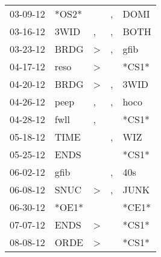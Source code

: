 \begin{supertabular}{p{0.07\textwidth}p{0.06\textwidth}p{0.02\textwidth}p{0.02\textwidth}p{0.06\textwidth}}
          03-09-12\textsuperscript{} &                            *OS2* &                  &                , &           DOMI\textsuperscript{} \\
          03-16-12\textsuperscript{} &           3WID\textsuperscript{} &                , &                , &           BOTH\textsuperscript{} \\
          03-23-12\textsuperscript{} &           BRDG\textsuperscript{} &     \textgreater &                , &           gfib\textsuperscript{} \\
          04-17-12\textsuperscript{} &           reso\textsuperscript{} &     \textgreater &                  &                            *CS1* \\
          04-20-12\textsuperscript{} &           BRDG\textsuperscript{} &     \textgreater &                , &           3WID\textsuperscript{} \\
          04-26-12\textsuperscript{} &           peep\textsuperscript{} &                , &                , &           hoco\textsuperscript{} \\
          04-28-12\textsuperscript{} &           fwll\textsuperscript{} &                , &                  &                            *CS1* \\
          05-18-12\textsuperscript{} &           TIME\textsuperscript{} &                  &                , &            WIZ\textsuperscript{} \\
          05-25-12\textsuperscript{} &           ENDS\textsuperscript{} &                  &                  &                            *CS1* \\
          06-02-12\textsuperscript{} &           gfib\textsuperscript{} &                  &                , &            40s\textsuperscript{} \\
          06-08-12\textsuperscript{} &           SNUC\textsuperscript{} &     \textgreater &                , &           JUNK\textsuperscript{} \\
          06-30-12\textsuperscript{} &                            *OE1* &                  &                  &                            *CE1* \\
          07-07-12\textsuperscript{} &           ENDS\textsuperscript{} &     \textgreater &                  &                            *CS1* \\
          08-08-12\textsuperscript{} &           ORDE\textsuperscript{} &     \textgreater &                  &                            *CS1* \\

\end{supertabular}
